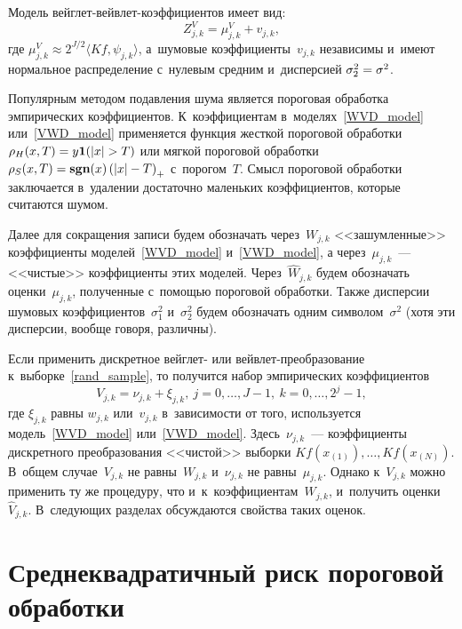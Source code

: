 \begin{multicols}{2}
Модель вейглет-вейвлет-ко\-эф\-фи\-ци\-ен\-тов имеет вид:
%
\begin{equation}                                                            
   \label{VWD_model}
Z^{V}_{j,k} = \mu^{V}_{j,k} +   v_{j,k},
\end{equation}
%
где $\mu^{V}_{j,k}\approx 2^{J/2}\langle Kf,\psi_{j,k}\rangle$, 
а~шумовые коэффициенты~$v_{j,k}$ независимы и~имеют нормальное распределение с~нулевым 
средним и~дисперсией $\sigma_2^2\hm=\sigma^2$.

Популярным методом подавления шума является пороговая обработка 
эмпирических коэффициентов. К~коэффициентам в~моделях~\eqref{WVD_model} 
или~\eqref{VWD_model} применяется функция жесткой пороговой 
обработки $\rho_{H}(x,T)\hm =y\mathbf{1}(\abs{x}>T)$ или мягкой пороговой обработки $\rho_{S}(x,T)
\hm=\textbf{sgn}(x)\left(\abs{x}-T\right)_{+}$ с~порогом~$T$. Смысл пороговой 
обработки заключается в~удалении достаточно маленьких коэффициентов, которые считаются шумом.

Далее для сокращения записи будем обозначать через~$W_{j,k}$ 
<<зашумленные>> коэффициенты моделей~\eqref{WVD_model} и~\eqref{VWD_model}, а через~$\mu_{j,k}$~--- 
<<чистые>> коэффициенты этих моделей. Через~$\widehat{W}_{j,k}$ будем обозначать оценки~$\mu_{j,k}$, 
полученные с~помощью пороговой обработки. Также дисперсии шумовых коэффициентов~$\sigma_1^2$ 
и~$\sigma_2^2$ будем обозначать одним символом~$\sigma^2$ (хотя эти дисперсии, вообще говоря, различны).

Если применить дискретное вейглет- или вейв\-лет-пре\-об\-ра\-зо\-ва\-ние к~выборке~\eqref{rand_sample}, 
то получится набор эмпирических коэффициентов
$$
V_{j,k}=\nu_{j,k}+\xi_{j,k},\ j=0,\ldots,J-1,\ k=0,\ldots,2^{j}-1,
$$
где $\xi_{j,k}$ равны $w_{j,k}$ или~$v_{j,k}$ в~зависимости от того, используется 
модель~\eqref{WVD_model} или~\eqref{VWD_model}. Здесь~$\nu_{j,k}$~--- 
коэффициенты дискретного преобразования <<чис\-той>> выборки 
$Kf\left(x_{(1)}\right),\ldots, Kf\left(x_{(N)}\right).$
В~общем случае~$V_{j,k}$ не равны~$W_{j,k}$ и~$\nu_{j,k}$ не равны~$\mu_{j,k}$. Однако к~$V_{j,k}$ 
можно применить ту же процедуру, что и~к~коэффициентам~$W_{j,k}$, 
и~получить оценки~$\widehat{V}_{j,k}$. В~следующих разделах обсуждаются свойства таких оценок.

\vspace*{-4pt}

\section{Среднеквадратичный риск пороговой обработки}


\end{multicols}
